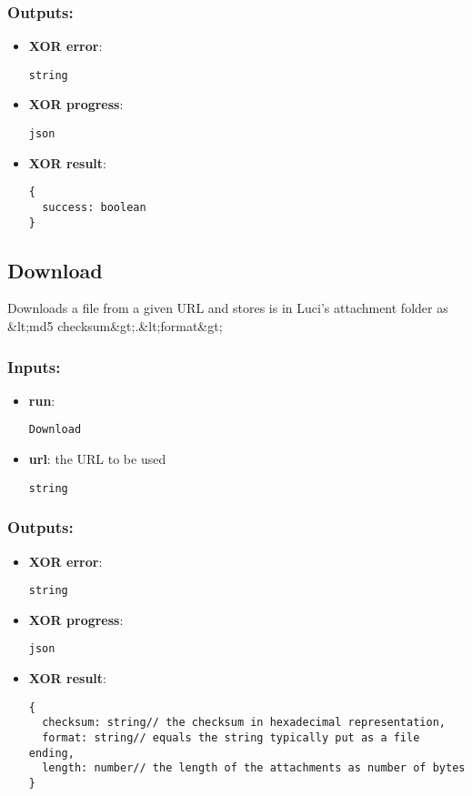 \subsubsection*{Outputs:}
\begin{itemize}
    \item \textbf{XOR error}: 
\begin{lstlisting}
string
\end{lstlisting}
    \item \textbf{XOR progress}: 
\begin{lstlisting}
json
\end{lstlisting}
    \item \textbf{XOR result}: 
\begin{lstlisting}
{
  success: boolean
}
\end{lstlisting}
  \end{itemize}

\subsection{Download}
\label{ch:builtinservices:Download}
Downloads
 a file from a given URL and stores is in Luci's attachment folder as 
\&lt;md5 checksum\&gt;.\&lt;format\&gt; 
\subsubsection*{Inputs:}
\begin{itemize}
    \item \textbf{run}: 
\begin{lstlisting}
Download
\end{lstlisting}
    \item \textbf{url}: the URL to be used
\begin{lstlisting}
string
\end{lstlisting}
  \end{itemize}

\subsubsection*{Outputs:}
\begin{itemize}
    \item \textbf{XOR error}: 
\begin{lstlisting}
string
\end{lstlisting}
    \item \textbf{XOR progress}: 
\begin{lstlisting}
json
\end{lstlisting}
    \item \textbf{XOR result}: 
\begin{lstlisting}
{
  checksum: string// the checksum in hexadecimal representation, 
  format: string// equals the string typically put as a file ending, 
  length: number// the length of the attachments as number of bytes
}
\end{lstlisting}
  \end{itemize}

